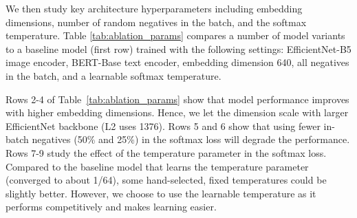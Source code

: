 \documentclass{article}
\begin{document}
We then study key architecture hyperparameters including embedding dimensions,
number of random negatives in the batch, and the softmax temperature. Table \ref{tab:ablation_params} compares a number of model variants to a baseline model (first row) trained with the following settings: EfficientNet-B5 image encoder, BERT-Base text encoder, embedding dimension 640, all negatives in the batch, and a learnable softmax temperature.

Rows 2-4 of Table~\ref{tab:ablation_params} show that model performance improves with higher embedding dimensions. Hence, we let the dimension scale with larger EfficientNet backbone (L2 uses 1376). Rows 5 and 6 show that using fewer in-batch negatives (50\% and 25\%) in the softmax loss will degrade the performance. Rows 7-9 study the effect of the temperature parameter in the softmax loss. Compared to the baseline model that learns the temperature parameter (converged to about 1/64), some hand-selected, fixed temperatures could be slightly better. However, we choose to use the learnable temperature as it performs competitively and makes learning easier.

\begin{table}[h!]
\vspace{-2mm}
\centering
\small
\caption{Ablation study of key architecture parameters. Baseline model (first row) is trained with embedding dimension 640, using all negatives in the batch, and a learnable softmax temperature.}
\label{tab:ablation_params}
\vspace{1mm}
\end{table}
\end{document}
